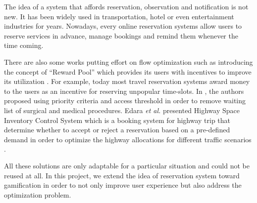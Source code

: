 The idea of a system that affords reservation, observation and notification is not new. It has been widely used in transportation, hotel or even entertainment industries for years. Nowadays, every online reservation systems allow users to reserve services in advance, manage bookings and remind them whenever the time coming. 

There are also some works putting effort on flow optimization such as introducing the concept of ``Reward Pool'' which provides its users with incentives to improve its utilization \cite{winand2006methods}. For example, today most travel reservation systems  award money to the users as an incentive for reserving unpopular time-slots. In \cite{gauld2000solving}, the authors proposed using priority criteria and access threshold in order to remove waiting list of surgical and medical procedures. Edara \emph{et al.} presented Highway Space Inventory Control System which is a booking system for highway trip that determine whether to accept or reject a reservation based on a pre-defined demand in order to optimize the highway allocations for different traffic scenarios \cite{edara2008model}. 

All these solutions are only adaptable for a particular situation and could not be reused at all. In this project, we extend the idea of reservation system toward gamification in order to not only improve user experience but also address the optimization problem.